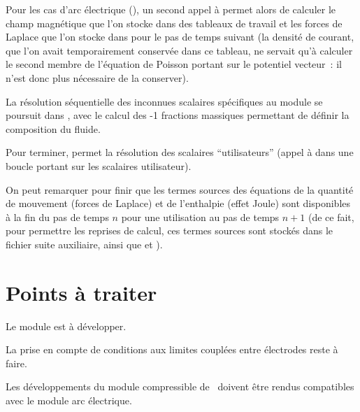 Pour les cas d'arc \'electrique (), un second appel \`a
 permet alors de calculer le champ magn\'etique
que l'on stocke dans des tableaux de travail et les forces de Laplace que l'on stocke dans
 pour le pas de temps suivant (la densit\'e de
courant, que l'on avait temporairement conserv\'ee dans ce tableau, ne servait
qu'\`a calculer le second membre de l'\'equation de Poisson portant sur le
potentiel vecteur~: il n'est donc plus n\'ecessaire de la conserver). 

La r\'esolution s\'equentielle des inconnues scalaires sp\'ecifiques au module se poursuit dans
, avec le calcul des -1 fractions massiques permettant
de d\'efinir la composition du fluide. 

Pour terminer,  permet la r\'esolution des scalaires
``utilisateurs'' (appel \`a  dans une boucle portant sur les
 scalaires utilisateur). 

On peut remarquer pour finir que les termes sources des \'equations de la quantit\'e de
mouvement (forces de Laplace) et de l'enthalpie (effet Joule) sont disponibles 
\`a la fin du pas de temps $n$ pour une utilisation au pas de temps $n+1$ (de ce
fait, pour permettre les reprises de calcul, ces termes sources sont stock\'es dans le fichier suite auxiliaire, ainsi que 
et ). 

\newpage
\section{Points \`a traiter}

 Le module est \`a d\'evelopper. 

 La prise en compte de conditions aux
limites coupl\'ees entre \'electrodes reste  \`a faire. 

 Les  d\'eveloppements du module
compressible de \CS\ doivent \^etre rendus compatibles avec le module arc \'electrique. 

